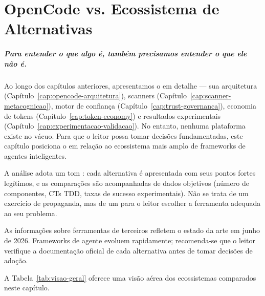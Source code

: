 \chapter{OpenCode vs. Ecossistema de Alternativas}
\label{ch:comparacao}

\paragraph{Para entender o que algo é, também precisamos entender o que ele
não é.} Ao longo dos capítulos anteriores, apresentamos o \opencodeeco{} em
detalhe --- sua arquitetura (Capítulo~\ref{cap:opencode-arquitetura}),
scanners (Capítulo~\ref{cap:scanner-metacognicao}), motor de confiança
(Capítulo~\ref{cap:trust-governanca}), economia de tokens
(Capítulo~\ref{cap:token-economy}) e resultados experimentais
(Capítulo~\ref{cap:experimentacao-validacao}). No entanto, nenhuma
plataforma existe no vácuo. Para que o leitor possa tomar decisões
fundamentadas, este capítulo posiciona o \opencodeeco{} em relação ao
ecossistema mais amplo de frameworks de agentes inteligentes.

A análise adota um tom : cada alternativa é
apresentada com seus pontos fortes legítimos, e as comparações são
acompanhadas de dados objetivos (número de componentes, CTs TDD, taxas de
sucesso experimentais). Não se trata de um exercício de propaganda, mas de
um  para o leitor escolher a ferramenta adequada
ao seu problema.

\begin{observacao}
As informações sobre ferramentas de terceiros refletem o estado da arte em
junho de 2026. Frameworks de agente evoluem rapidamente; recomenda-se que o
leitor verifique a documentação oficial de cada alternativa antes de tomar
decisões de adoção.
\end{observacao}

A Tabela~\ref{tab:visao-geral} oferece uma visão aérea dos ecossistemas
comparados neste capítulo.

